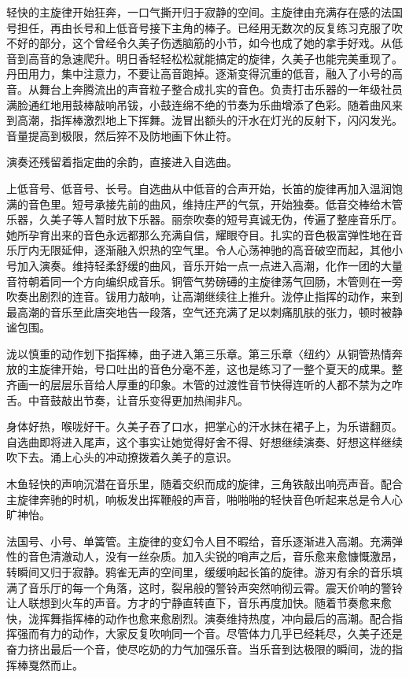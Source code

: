 \documentclass[UTF8]{ctexart}
\begin{document}
    轻快的主旋律开始狂奔，一口气撕开归于寂静的空间。主旋律由充满存在感的法国号担任，再由长号和上低音号接下主角的棒子。已经用无数次的反复练习克服了吹不好的部分，这个曾经令久美子伤透脑筋的小节，如今也成了她的拿手好戏。从低音到高音的急速爬升。明日香轻轻松松就能搞定的旋律，久美子也能完美重现了。丹田用力，集中注意力，不要让高音跑掉。逐渐变得沉重的低音，融入了小号的高音。从舞台上奔腾流出的声音粒子整合成扎实的音色。负责打击乐器的一年级社员满脸通红地用鼓棒敲响吊钹，小鼓连绵不绝的节奏为乐曲增添了色彩。随着曲风来到高潮，指挥棒激烈地上下挥舞。泷冒出额头的汗水在灯光的反射下，闪闪发光。音量提高到极限，然后猝不及防地画下休止符。 

    演奏还残留着指定曲的余韵，直接进入自选曲。 

    上低音号、低音号、长号。自选曲从中低音的合声开始，长笛的旋律再加入温润饱满的音色里。短号承接先前的曲风，维持庄严的气氛，开始独奏。低音交棒给木管乐器，久美子等人暂时放下乐器。丽奈吹奏的短号真诚无伪，传遍了整座音乐厅。她所孕育出来的音色永远都那么充满自信，耀眼夺目。扎实的音色极富弹性地在音乐厅内无限延伸，逐渐融入炽热的空气里。令人心荡神驰的高音破空而起，其他小号加入演奏。维持轻柔舒缓的曲风，音乐开始一点一点进入高潮，化作一团的大量音符朝着同一个方向编织成音乐。铜管气势磅礡的主旋律荡气回肠，木管则在一旁吹奏出剧烈的连音。钹用力敲响，让高潮继续往上推升。泷停止指挥的动作，来到最高潮的音乐至此唐突地告一段落，空气还充满了足以刺痛肌肤的张力，顿时被静谧包围。 

    泷以慎重的动作划下指挥棒，曲子进入第三乐章。第三乐章〈纽约〉从铜管热情奔放的主旋律开始，号口吐出的音色分毫不差，这也是练习了一整个夏天的成果。整齐画一的层层乐音给人厚重的印象。木管的过渡性音节快得连听的人都不禁为之咋舌。中音鼓敲出节奏，让音乐变得更加热闹非凡。 

    身体好热，喉咙好干。久美子吞了口水，把掌心的汗水抹在裙子上，为乐谱翻页。自选曲即将进入尾声，这个事实让她觉得好舍不得、好想继续演奏、好想这样继续吹下去。涌上心头的冲动撩拨着久美子的意识。 

    木鱼轻快的声响沉潜在音乐里，随着交织而成的旋律，三角铁敲出响亮声音。配合主旋律奔驰的时机，响板发出挥鞭般的声音，啪啪啪的轻快音色听起来总是令人心旷神怡。 

    法国号、小号、单簧管。主旋律的变幻令人目不暇给，音乐逐渐进入高潮。充满弹性的音色清澈动人，没有一丝杂质。加入尖锐的哨声之后，音乐愈来愈慷慨激昂，转瞬间又归于寂静。鸦雀无声的空间里，缓缓响起长笛的旋律。游刃有余的音乐填满了音乐厅的每一个角落，这时，裂帛般的警铃声突然响彻云霄。震天价响的警铃让人联想到火车的声音。方才的宁静直转直下，音乐再度加快。随着节奏愈来愈快，泷挥舞指挥棒的动作也愈来愈剧烈。演奏维持热度，冲向最后的高潮。配合指挥强而有力的动作，大家反复吹响同一个音。尽管体力几乎已经耗尽，久美子还是奋力挤出最后一个音，使尽吃奶的力气加强乐音。当乐音到达极限的瞬间，泷的指挥棒戛然而止。 
\end{document}
